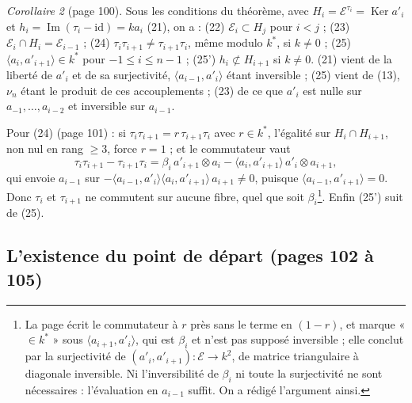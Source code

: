 \documentclass[11pt,a4paper]{article}
\begin{document}
\emph{Corollaire 2} (page 100). Sous les conditions du théorème, avec $H_i =
\mathcal{E}^{\tau_i} = \operatorname{Ker} a'_i$ et $h_i = \operatorname{Im}(\tau_i
- \mathrm{id}) = ka_i$ (21), on a : (22) $\mathcal{E}_i \subset H_j$ pour $i <
j$ ; (23) $\mathcal{E}_i \cap H_i = \mathcal{E}_{i-1}$ ; (24) $\tau_i\tau_{i+1}
\neq \tau_{i+1}\tau_i$, même modulo $k^*$, si $k \neq 0$ ; (25) $\langle a_i,
a'_{i+1} \rangle \in k^*$ pour $-1 \leqslant i \leqslant n-1$ ; (25') $h_i
\not\subset H_{i+1}$ si $k \neq 0$. (21) vient de la liberté de $a'_i$ et de sa
surjectivité, $\langle a_{i-1}, a'_i \rangle$ étant inversible ; (25) vient de
(13), $\nu_n$ étant le produit de ces accouplements ; (23) de ce que $a'_i$ est
nulle sur $a_{-1}, \ldots, a_{i-2}$ et inversible sur $a_{i-1}$.

Pour (24) (page 101) : si $\tau_i\tau_{i+1} = r\,\tau_{i+1}\tau_i$ avec $r \in
k^*$, l'égalité sur $H_i \cap H_{i+1}$, non nul en rang $\geqslant 3$, force $r
= 1$ ; et le commutateur vaut
\[
\tau_i\tau_{i+1} - \tau_{i+1}\tau_i = \beta_i\, a'_{i+1} \otimes a_i - \langle
a_i, a'_{i+1} \rangle\, a'_i \otimes a_{i+1},
\]
qui envoie $a_{i-1}$ sur $-\langle a_{i-1}, a'_i \rangle\langle a_i, a'_{i+1}
\rangle\, a_{i+1} \neq 0$, puisque $\langle a_{i-1}, a'_{i+1} \rangle = 0$. Donc
$\tau_i$ et $\tau_{i+1}$ ne commutent sur aucune fibre, quel que soit
$\beta_i$\footnote{La page écrit le commutateur à $r$ près sans le terme en
$(1-r)$, et marque « $\in k^*$ » sous $\langle a_{i+1}, a'_i \rangle$, qui est
$\beta_i$ et n'est pas supposé inversible ; elle conclut par la surjectivité de
$(a'_i, a'_{i+1}) \colon \mathcal{E} \to k^2$, de matrice triangulaire à
diagonale inversible. Ni l'inversibilité de $\beta_i$ ni toute la surjectivité ne
sont nécessaires : l'évaluation en $a_{i-1}$ suffit. On a rédigé l'argument
ainsi.}. Enfin (25') suit de (25).

\subsection*{L'existence du point de départ (pages 102 à 105)}
\end{document}
